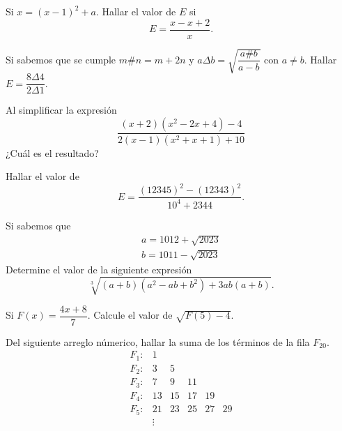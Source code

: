 \begin{section-problem}
    Si $\boxed{x} =  (x - 1)^2 + a$.
    Hallar el valor de $E$ si
    \[E =  \dfrac{\boxed{x} - \boxed{x + 2}}{x}.\]
\end{section-problem}

\begin{section-problem}
    Si sabemos que se cumple $m \# n = m + 2n$ y $a \Delta b = \sqrt{\dfrac{a \# b}{a - b}}$ con $a \neq b$.
    Hallar $E = \dfrac{8 \Delta 4}{2 \Delta 1}.$
\end{section-problem}

\begin{section-problem}
    Al simplificar la expresión
    \[\dfrac{(x + 2)(x^2 - 2x + 4) - 4}{2(x -1)(x^2 + x + 1) + 10}\]
    ¿Cuál es el resultado?
\end{section-problem}

\begin{section-problem}
    Hallar el valor de \[E =  \dfrac{(12345)^2 - (12343)^2}{10^4 + 2344}.\]
\end{section-problem}

\begin{section-problem}
    Si sabemos que
    \begin{gather*}
        a = 1012 + \sqrt {2023}\\
        b = 1011 - \sqrt {2023}
    \end{gather*}
    Determine el valor de la siguiente expresión \[\sqrt[3]{(a + b)(a^2 - ab + b^2) + 3ab(a + b)}.\]
\end{section-problem}

\begin{section-problem}
    Si $F(x) = \dfrac{4x + 8}{7}$.
    Calcule el valor de $\sqrt{F(5) - 4}$.
\end{section-problem}

\begin{section-problem}
    Del siguiente arreglo númerico, hallar la suma de los términos de la fila $F_{20}$.
    \[
        \begin{array}{rccccc}
            F_1: & 1 \\
            F_2: & 3 & 5\\
            F_3: & 7 & 9 & 11\\
            F_4: & 13 & 15 & 17 & 19 \\
            F_5: & 21 & 23 & 25 & 27 & 29\\
            &\vdots
        \end{array}
    \]
\end{section-problem}

